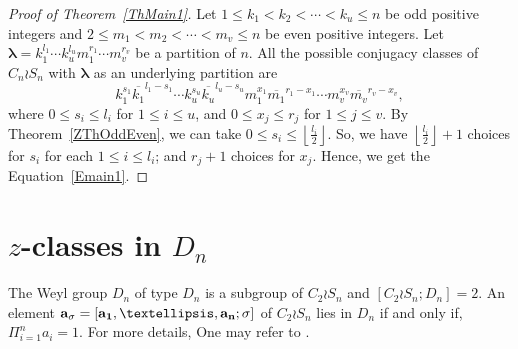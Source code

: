 \documentclass[12pt,twoside,reqno]{amsart}
\theoremstyle{definition}
\numberwithin{equation}{section}
\newcommand{\Lbd}{\bm {\lambda}}
\begin{document}
\begin{proof}[Proof of Theorem~\ref{ThMain1}]
Let $1 \leq k_1 < k_2 < \cdots < k_u \leq n$ be odd positive integers and $2 \leq m_1 < m_2 < \cdots <m_v \leq n$ be even positive integers. Let $\Lbd=k_1^{l_1}\cdots k_u^{l_u}m_1^{r_1}\cdots m_v^{r_v}$ be a partition of $n$. All the possible conjugacy classes of $C_n \wr S_n$ with $\Lbd$ as an underlying partition are $$k_1^{s_1}\overline{k_1}^{l_1-s_1}\cdots k_u^{s_u}\overline{k_u}^{l_u-s_u}m_1^{x_1}\overline{m_1}^{r_1-x_1} \cdots m_v^{x_v}\overline{m_v}^{r_v-x_v},$$ where $0 \leq s_i \leq l_i$ for $1 \leq i \leq u$, and $0 \leq x_j \leq r_j$ for $1 \leq j \leq v$. By Theorem~\ref{ZThOddEven}, we can take $0 \leq s_i \leq \left\lfloor \frac{l_i}{2}\right\rfloor$. So, we have $\left\lfloor \frac{l_i}{2}\right\rfloor + 1$ choices for $s_i$ for each $1 \leq i \leq l_i$; and $r_j + 1$ choices for $x_j$. Hence, we get the Equation~\ref{Emain1}.
\end{proof}


\section{$z$-classes in $D_n$}\label{$z$-Classes of $D_n$}
The Weyl group $D_n$ of type $D_n$ is a subgroup of $C_2 \wr  S_n$ and $[C_2\wr S_n; D_n]=2.$ An element $\bf{a_\sigma} = [a_1,\ldots, a_n; \sigma]$ of $C_2\wr S_n$ lies in $D_n$ if and only if, $\Pi_{i=1}^n a_i =1.$ For more details, One may refer to \cite{Ca, LFV}. 
\end{document}
